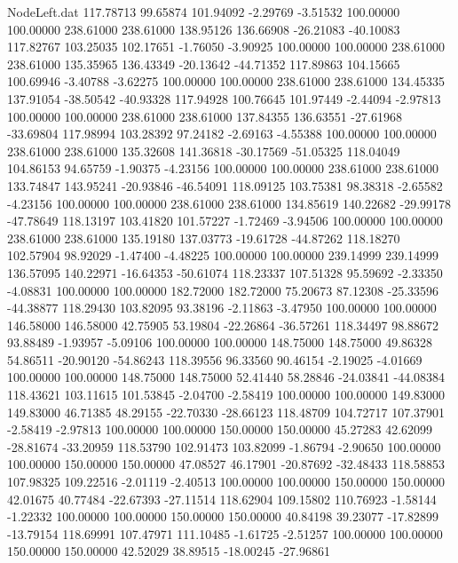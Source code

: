 \begin{filecontents}{NodeLeft.dat}
 117.78713   99.65874  101.94092    -2.29769   -3.51532  100.00000  100.00000  238.61000  238.61000  138.95126  136.66908  -26.21083  -40.10083
 117.82767  103.25035  102.17651    -1.76050   -3.90925  100.00000  100.00000  238.61000  238.61000  135.35965  136.43349  -20.13642  -44.71352
 117.89863  104.15665  100.69946    -3.40788   -3.62275  100.00000  100.00000  238.61000  238.61000  134.45335  137.91054  -38.50542  -40.93328
 117.94928  100.76645  101.97449    -2.44094   -2.97813  100.00000  100.00000  238.61000  238.61000  137.84355  136.63551  -27.61968  -33.69804
 117.98994  103.28392   97.24182    -2.69163   -4.55388  100.00000  100.00000  238.61000  238.61000  135.32608  141.36818  -30.17569  -51.05325
 118.04049  104.86153   94.65759    -1.90375   -4.23156  100.00000  100.00000  238.61000  238.61000  133.74847  143.95241  -20.93846  -46.54091
 118.09125  103.75381   98.38318    -2.65582   -4.23156  100.00000  100.00000  238.61000  238.61000  134.85619  140.22682  -29.99178  -47.78649
 118.13197  103.41820  101.57227    -1.72469   -3.94506  100.00000  100.00000  238.61000  238.61000  135.19180  137.03773  -19.61728  -44.87262
 118.18270  102.57904   98.92029    -1.47400   -4.48225  100.00000  100.00000  239.14999  239.14999  136.57095  140.22971  -16.64353  -50.61074
 118.23337  107.51328   95.59692    -2.33350   -4.08831  100.00000  100.00000  182.72000  182.72000   75.20673   87.12308  -25.33596  -44.38877
 118.29430  103.82095   93.38196    -2.11863   -3.47950  100.00000  100.00000  146.58000  146.58000   42.75905   53.19804  -22.26864  -36.57261
 118.34497   98.88672   93.88489    -1.93957   -5.09106  100.00000  100.00000  148.75000  148.75000   49.86328   54.86511  -20.90120  -54.86243
 118.39556   96.33560   90.46154    -2.19025   -4.01669  100.00000  100.00000  148.75000  148.75000   52.41440   58.28846  -24.03841  -44.08384
 118.43621  103.11615  101.53845    -2.04700   -2.58419  100.00000  100.00000  149.83000  149.83000   46.71385   48.29155  -22.70330  -28.66123
 118.48709  104.72717  107.37901    -2.58419   -2.97813  100.00000  100.00000  150.00000  150.00000   45.27283   42.62099  -28.81674  -33.20959
 118.53790  102.91473  103.82099    -1.86794   -2.90650  100.00000  100.00000  150.00000  150.00000   47.08527   46.17901  -20.87692  -32.48433
 118.58853  107.98325  109.22516    -2.01119   -2.40513  100.00000  100.00000  150.00000  150.00000   42.01675   40.77484  -22.67393  -27.11514
 118.62904  109.15802  110.76923    -1.58144   -1.22332  100.00000  100.00000  150.00000  150.00000   40.84198   39.23077  -17.82899  -13.79154
 118.69991  107.47971  111.10485    -1.61725   -2.51257  100.00000  100.00000  150.00000  150.00000   42.52029   38.89515  -18.00245  -27.96861

\end{filecontents}
